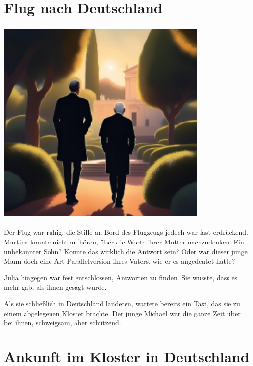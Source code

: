 \documentclass[
]{article}
\begin{document}
\section{Flug nach Deutschland}\label{flug-nach-deutschland}

\includegraphics[width=4.09531in,height=4.08008in]{media/image1.png}

Der Flug war ruhig, die Stille an Bord des Flugzeugs jedoch war fast
erdrückend. Martina konnte nicht aufhören, über die Worte ihrer Mutter
nachzudenken. Ein unbekannter Sohn? Konnte das wirklich die Antwort
sein? Oder war dieser junge Mann doch eine Art Parallelversion ihres
Vaters, wie er es angedeutet hatte?

Julia hingegen war fest entschlossen, Antworten zu finden. Sie wusste,
dass es mehr gab, als ihnen gesagt wurde.

Als sie schließlich in Deutschland landeten, wartete bereits ein Taxi,
das sie zu einem abgelegenen Kloster brachte. Der junge Michael war die
ganze Zeit über bei ihnen, schweigsam, aber schützend.

\section{Ankunft im Kloster in
Deutschland}\label{ankunft-im-kloster-in-deutschland}
\end{document}

